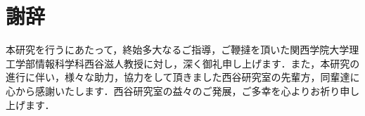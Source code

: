 \chapter*{謝辞}\label{ux8b1dux8f9e}

本研究を行うにあたって，終始多大なるご指導，ご鞭撻を頂いた関西学院大学理工学部情報科学科西谷滋人教授に対し，深く御礼申し上げます．また，本研究の進行に伴い，様々な助力，協力をして頂きました西谷研究室の先輩方，同輩達に心から感謝いたします．西谷研究室の益々のご発展，ご多幸を心よりお祈り申し上げます．

    